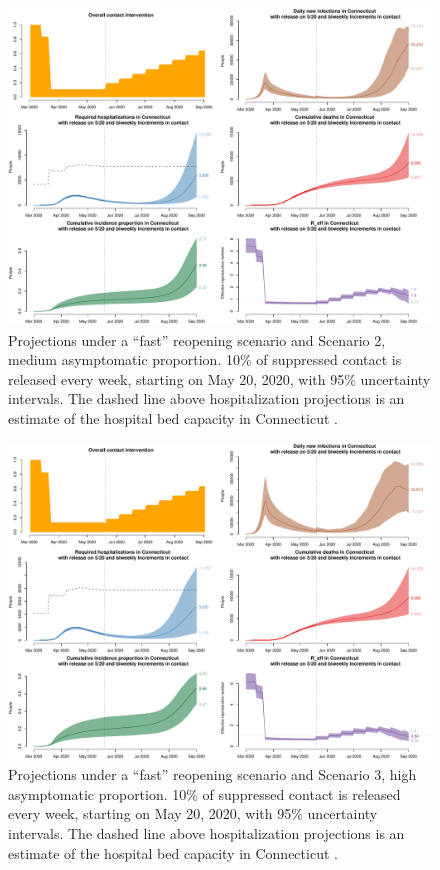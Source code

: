 \documentclass[11pt]{article}
\begin{document}
\begin{figure} %
	\centering
	\includegraphics[width=.9\textwidth]{figures/fast_medium_full.pdf}
	\caption{Projections under a ``fast'' reopening scenario and Scenario 2, medium asymptomatic proportion. 10\% of suppressed contact is released every week, starting on May 20, 2020, with 95\% uncertainty intervals. The dashed line above hospitalization projections is an estimate of the hospital bed capacity in Connecticut \citep{CHAwebsite}. }
	\label{fig:fast_medium}
\end{figure}

\begin{figure} %
	\centering
	\includegraphics[width=.9\textwidth]{figures/fast_high_full.pdf}
	\caption{Projections under a ``fast'' reopening scenario and Scenario 3, high asymptomatic proportion. 10\% of suppressed contact is released every week, starting on May 20, 2020, with 95\% uncertainty intervals. The dashed line above hospitalization projections is an estimate of the hospital bed capacity in Connecticut \citep{CHAwebsite}. }
	\label{fig:fast_high}
\end{figure}
\end{document}
